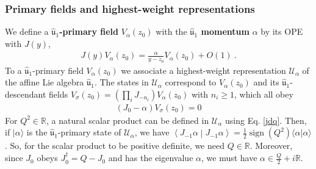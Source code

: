 \documentclass[12pt, a4paper, notitlepage, twoside]{report}
\numberwithin{equation}{section}
\theoremstyle{break}
\begin{document}
\subsubsection{Primary fields and highest-weight representations}

We define a \textbf{\boldmath $\hat{\mathfrak{u}}_1$-primary field} $V_{\alpha}(z_0)$ with the \textbf{\boldmath $\hat{\mathfrak{u}}_1$ momentum} $\alpha$ by its OPE with $J(y)$,
\begin{align}
 \boxed{J(y) V_\alpha(z_0) = \frac{\alpha}{y-z_0} V_\alpha(z_0) + O(1)}\ .
\label{jva}
\end{align}
To a $\hat{\mathfrak{u}}_1$-primary field $V_\alpha(z_0)$ we associate a highest-weight representation $\mathcal{U}_\alpha$ of the  affine Lie algebra $\hat{\mathfrak{u}}_1$.
The states in $\mathcal{U}_\alpha$ correspond to $V_\alpha(z_0)$ and its $\hat{\mathfrak{u}}_1$-descendant fields $V_\sigma(z_0)=\left(\prod_i J_{-n_i}\right) V_\alpha(z_0)$ with $n_i\geq 1$, which all obey 
\begin{align}
 \left(J_0 - \alpha\right) V_\sigma(z_0) = 0
\label{jma}
\end{align}
For $Q^2\in\mathbb{R}$, 
a natural scalar product can be defined in $\mathcal{U}_\alpha$ using Eq. \eqref{jdq}.
Then, if $|\alpha\rangle$ is the $\hat{\mathfrak{u}}_1$-primary state of $\mathcal{U}_\alpha$, we have $\left< J_{-1}\alpha\middle|J_{-1}\alpha\right> = \frac12 \operatorname{sign}(Q^2) \langle \alpha|\alpha\rangle$.
So, for the scalar product to be positive definite, we need $Q\in \mathbb{R}$.
Moreover, since $J_0$ obeys $J_0^\dagger = Q-J_0$ and has the eigenvalue $\alpha$, we must have $\alpha \in \frac{Q}{2} + i{\mathbb{R}}$.
\end{document}
